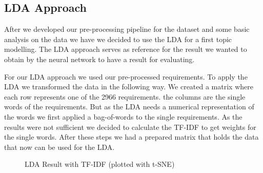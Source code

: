 \subsection{LDA Approach} %
\label{sub:own_lda}

After we developed our pre-processing pipeline for the dataset and some basic analysis on the data we have we decided to use the LDA for a first topic modelling. The LDA approach serves as reference for the result we wanted to obtain by the neural network to have a result for evaluating.


For our LDA approach we used our pre-processed requirements. To apply the LDA we transformed the data in the following way. We created a matrix where each row represents one of the 2966 requirements. the columns are the single words of the requirements. But as the LDA needs a numerical representation of the words we first applied a bag-of-words to the single requirements. As the results were not sufficient we decided to calculate the TF-IDF to get weights for the single words. After these steps we had a prepared matrix that holds the data that now can be used for the LDA.

\begin{figure}[bht]
    \caption{LDA Result with TF-IDF (plotted with t-SNE)} \label{fig:lda-tf-idf}
\end{figure}
\FloatBarrier

